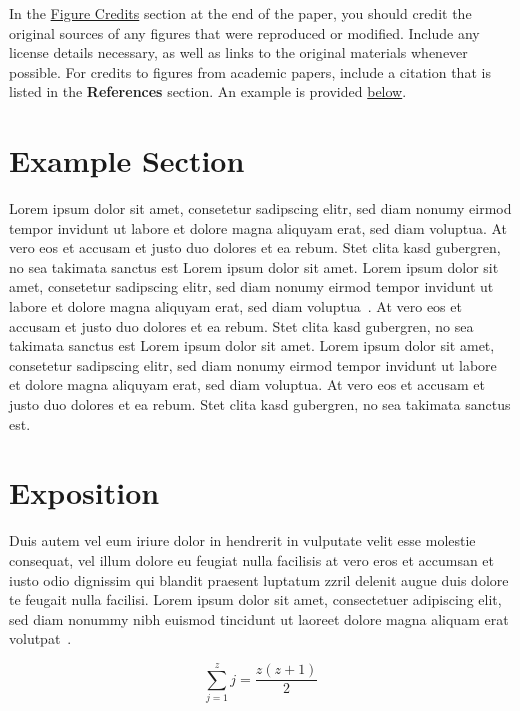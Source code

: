 \documentclass[review]{vgtc}                 %
\begin{document}
In the \hyperref[sec:figure_credits]{Figure Credits} section at the end of the paper, you should credit the original sources of any figures that were reproduced or modified.
Include any license details necessary, as well as links to the original materials whenever possible.
For credits to figures from academic papers, include a citation that is listed in the \textbf{References} section.
An example is provided \hyperref[sec:figure_credits]{below}.

\section{Example Section}

Lorem ipsum dolor sit amet, consetetur sadipscing elitr, sed diam
nonumy eirmod tempor invidunt ut labore et dolore magna aliquyam erat,
sed diam voluptua. At vero eos et accusam et justo duo dolores et ea
rebum. Stet clita kasd gubergren, no sea takimata sanctus est Lorem
ipsum dolor sit amet. Lorem ipsum dolor sit amet, consetetur
sadipscing elitr, sed diam nonumy eirmod tempor invidunt ut labore et
dolore magna aliquyam erat, sed diam
voluptua~\cite{Kitware:2003,Max:1995:OMF}. At vero eos et accusam et
justo duo dolores et ea rebum. Stet clita kasd gubergren, no sea
takimata sanctus est Lorem ipsum dolor sit amet. Lorem ipsum dolor sit
amet, consetetur sadipscing elitr, sed diam nonumy eirmod tempor
invidunt ut labore et dolore magna aliquyam erat, sed diam
voluptua. At vero eos et accusam et justo duo dolores et ea
rebum. Stet clita kasd gubergren, no sea takimata sanctus est.

\section{Exposition}

Duis autem vel eum iriure dolor in hendrerit in vulputate velit esse
molestie consequat, vel illum dolore eu feugiat nulla facilisis at
vero eros et accumsan et iusto odio dignissim qui blandit praesent
luptatum zzril delenit augue duis dolore te feugait nulla
facilisi. Lorem ipsum dolor sit amet, consectetuer adipiscing elit,
sed diam nonummy nibh euismod tincidunt ut laoreet dolore magna
aliquam erat volutpat~\cite{Kindlmann:1999:SAG}.

\begin{equation}
\sum_{j=1}^{z} j = \frac{z(z+1)}{2}
\end{equation}
\end{document}
